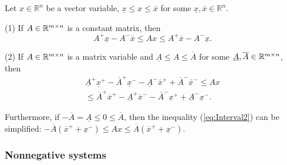 \begin{lemma}
	\textup{\citep{EFRZS12}} \label{lem:interval} Let $x\in\mathbb{R}^{n}$ be a vector variable, $\underline{x}\le x\le\overline{x}$ for some $\underline{x},\overline{x}\in\mathbb{R}^{n}$. 
	
	\textup{(1)} If $A\in\mathbb{R}^{m\times n}$ is a constant matrix, then
	\begin{equation}
	A^{+}\underline{x}-A^{-}\overline{x}\le Ax\le A^{+}\overline{x}-A^{-}\underline{x}.\label{eq:Interval1}
	\end{equation}
	
	\textup{(2)} If $A\in\mathbb{R}^{m\times n}$ is a matrix variable and \textup{$\underline{A}\le A\le\overline{A}$} for some $\underline{A},\overline{A}\in\mathbb{R}^{m\times n}$, then
	\begin{gather}
	\underline{A}^{+}\underline{x}^{+}-\overline{A}^{+}\underline{x}^{-}-\underline{A}^{-}\overline{x}^{+}+\overline{A}^{-}\overline{x}^{-}\leq Ax\label{eq:Interval2}\\
	\leq\overline{A}^{+}\overline{x}^{+}-\underline{A}^{+}\overline{x}^{-}-\overline{A}^{-}\underline{x}^{+}+\underline{A}^{-}\underline{x}^{-}.\nonumber 
	\end{gather}
\end{lemma}
Furthermore, if $-\overline{A}=\underline{A}\le0\le\overline{A}$, then the inequality (\ref{eq:Interval2}) can be simplified: $-\overline{A}(\overline{x}^{+}+\underline{x}^{-})\leq Ax\leq\overline{A}(\overline{x}^{+}+\underline{x}^{-})$.

\subsubsection{Nonnegative systems}

